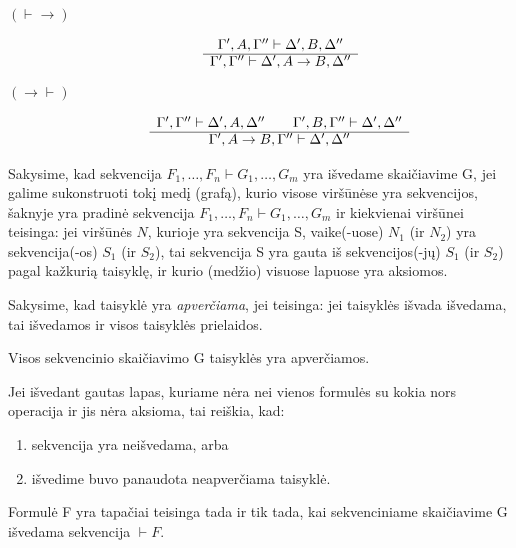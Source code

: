 \begin{defn}
\begin{description}
\[\begin{array}{c}
      \end{array}
      \]
    \item[$(\vdash \to)$] 
      \[
      \begin{array}{c}
        \Gamma',A,\Gamma'' \vdash \Delta',B,\Delta'' \\
        \cline{1-1}
        \Gamma',\Gamma'' \vdash \Delta',A \to B,\Delta''
      \end{array}
      \]
    \item[$(\to \vdash)$] 
      \[
      \begin{array}{c}
        \Gamma',\Gamma'' \vdash \Delta',A,\Delta'' \qquad %
        \Gamma',B,\Gamma'' \vdash \Delta',\Delta'' \\
        \cline{1-1}
        \Gamma',A \to B,\Gamma'' \vdash \Delta',\Delta''
      \end{array}
      \]
  \end{description}
\end{defn}

Sakysime, kad sekvencija $F_{1},\dots,F_{n} \vdash G_{1},\dots,G_{m}$ yra
išvedame skaičiavime G, jei galime sukonstruoti tokį medį (grafą),
kurio visose viršūnėse yra sekvencijos, šaknyje yra pradinė sekvencija
$F_{1},\dots,F_{n} \vdash G_{1},\dots,G_{m}$ ir kiekvienai viršūnei 
teisinga: jei viršūnės $N$, kurioje 
yra sekvencija S, vaike(-uose) $N_{1}$ (ir $N_{2}$) yra sekvencija(-os)
$S_{1}$ (ir $S_{2}$), tai sekvencija S yra gauta iš sekvencijos(-jų)
$S_{1}$ (ir $S_{2}$) pagal kažkurią taisyklę, ir kurio (medžio)
visuose lapuose yra aksiomos.

Sakysime, kad taisyklė yra \emph{apverčiama}, jei teisinga: jei taisyklės
išvada išvedama, tai išvedamos ir visos taisyklės prielaidos.

Visos sekvencinio skaičiavimo G taisyklės yra apverčiamos.

Jei išvedant gautas lapas, kuriame nėra nei vienos formulės su kokia
nors operacija ir jis nėra aksioma, tai reiškia, kad:
\begin{enumerate}
  \item sekvencija yra neišvedama, arba
  \item išvedime buvo panaudota neapverčiama taisyklė.
\end{enumerate}

\begin{prop}
  Formulė F yra tapačiai teisinga tada ir tik tada, kai sekvenciniame
  skaičiavime G išvedama sekvencija $\vdash F$.
\end{prop}
